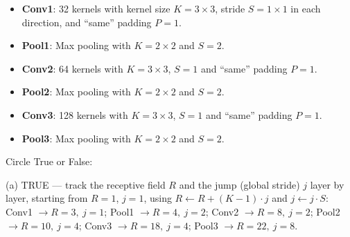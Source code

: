 \documentclass[11pt]{exam}
\newcommand{\TFT}{\ifprintanswers\textbf{TRUE}\hspace{1.1em}False\else True\hspace{1.1em}False\fi}
\newcommand{\TFF}{True\hspace{1.1em}\ifprintanswers\textbf{FALSE}\else False\fi}
\begin{document}
\begin{questions}
\begin{itemize}
  \item \textbf{Conv1}: 32 kernels with kernel size $K = 3 \times 3$, stride $S = 1 \times 1$ in
    each direction, and ``same'' padding $P = 1$.
  \item \textbf{Pool1}: Max pooling with $K = 2 \times 2$ and $S = 2$.
  \item \textbf{Conv2}: 64 kernels with $K = 3 \times 3$, $S = 1$ and ``same'' padding $P = 1$.
  \item \textbf{Pool2}: Max pooling with $K = 2 \times 2$ and $S = 2$.
  \item \textbf{Conv3}: 128 kernels with $K = 3 \times 3$, $S = 1$ and ``same'' padding $P = 1$.
  \item \textbf{Pool3}: Max pooling with $K = 2 \times 2$ and $S = 2$.
\end{itemize}

\noindent Circle True or False:


\begin{solution}
  (a) TRUE --- track the receptive field $R$ and the jump (global stride) $j$ layer by layer,
  starting from $R = 1$, $j = 1$, using $R \leftarrow R + (K-1)\cdot j$ and $j \leftarrow j \cdot S$:
  Conv1 $\rightarrow R = 3,\ j = 1$; Pool1 $\rightarrow R = 4,\ j = 2$;
  Conv2 $\rightarrow R = 8,\ j = 2$; Pool2 $\rightarrow R = 10,\ j = 4$;
  Conv3 $\rightarrow R = 18,\ j = 4$; Pool3 $\rightarrow R = 22,\ j = 8$.


\end{solution}
\end{questions}
\end{document}
